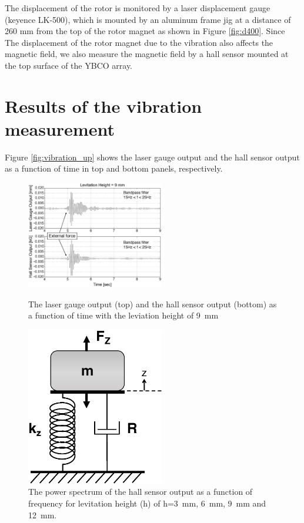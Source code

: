 \documentclass[a4paper]{jpconf}
\begin{document}
The displacement of the rotor is monitored by a laser displacement gauge (keyence LK-500),
which is mounted by an aluminum frame jig at a distance of 260 mm from the top of the rotor magnet as shown in Figure \ref{fig:d400}.
Since The displacement of the rotor magnet due to the vibration also affects the magnetic field,
we also measure the magnetic field by a hall sensor mounted at the top surface of the YBCO array.

\section*{Results of the vibration measurement}


Figure \ref{fig:vibration_up} shows the laser gauge output and the hall sensor output as a function of time in top and bottom panels, respectively.

\begin{figure}[htbp]
  \begin{flushleft}
    \begin{minipage}{0.4\hsize}
      \includegraphics[width=60mm]{vibration_up.eps}
      \caption{The laser gauge output (top) and the hall sensor output (bottom) as a function of time with the leviation height of 9~mm}
      \label{fig:vibration_up}
    \end{minipage}
  \end{flushleft}
  \begin{flushright}
    \begin{minipage}{0.4\hsize}
      \includegraphics[width=60mm]{SpringSystem.eps}
      \caption{The power spectrum of the hall sensor output as a function of frequency for levitation height (h) of h=3~mm, 6~mm, 9~mm and 12~mm. }
      \label{fig:vibration_fft}
    \end{minipage}
  \end{flushright}
\end{figure}
\end{document}
